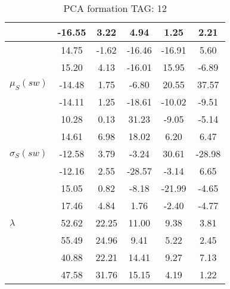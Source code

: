 \begin{table}[h!]
\begin{center}
\begin{tabular}{| l | c | c | c | c | c |}
 & -16.55  & 3.22  & 4.94  & 1.25  & 2.21 \\\hline
 & 14.75  & -1.62  & -16.46  & -16.91  & 5.60 \\\hline
 & 15.20  & 4.13  & -16.01  & 15.95  & -6.89 \\\hline
$\mu_S(sw)$ & -14.48  & 1.75  & -6.80  & 20.55  & 37.57 \\\hline
 & -14.11  & 1.25  & -18.61  & -10.02  & -9.51 \\\hline
 & 10.28  & 0.13  & 31.23  & -9.05  & -5.14 \\\hline
 & 14.61  & 6.98  & 18.02  & 6.20  & 6.47 \\\hline
$\sigma_S(sw)$ & -12.58  & 3.79  & -3.24  & 30.61  & -28.98 \\\hline
 & -12.16  & 2.55  & -28.57  & -3.14  & 6.65 \\\hline
 & 15.05  & 0.82  & -8.18  & -21.99  & -4.65 \\\hline
 & 17.46  & 4.84  & 1.76  & -2.40  & -4.77 \\\hline
$\lambda$ & 52.62  & 22.25  & 11.00  & 9.38  & 3.81 \\\hline
 & 55.49  & 24.96  & 9.41  & 5.22  & 2.45 \\\hline
 & 40.88  & 22.21  & 14.41  & 9.27  & 7.13 \\\hline
 & 47.58  & 31.76  & 15.15  & 4.19  & 1.22 \\\hline
\end{tabular}
\caption{PCA formation TAG: 12}
\end{center}
\end{table}